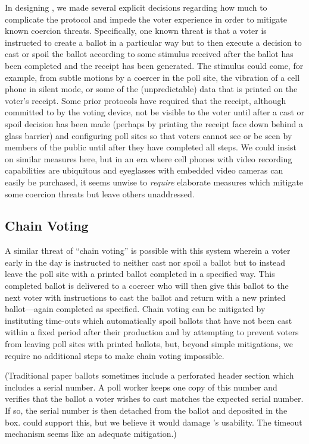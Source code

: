 \label{sec:coercion}

In designing \projname, we made several explicit decisions regarding how much to complicate the protocol and impede the voter experience in order to mitigate known coercion threats.  Specifically, one known threat is that a voter is instructed to create a ballot in a particular way but to then execute a decision to cast or spoil the ballot according to some stimulus received after the ballot has been completed and the receipt has been generated.  The stimulus could come, for example, from subtle motions by a coercer in the poll site, the vibration of a cell phone in silent mode, or some of the (unpredictable) data that is printed on the voter’s receipt.  Some prior protocols have required that the receipt, although committed to by the voting device, not be visible to the voter until after a cast or spoil decision has been made (perhaps by printing the receipt face down behind a glass barrier) and configuring poll sites so that voters cannot see or be seen by members of the public until after they have completed all steps.  We could insist on similar measures here, but in an era where cell phones with video recording capabilities are ubiquitous and eyeglasses with embedded video cameras can easily be purchased, it seems unwise to {\em require} elaborate measures which mitigate some coercion threats but leave others unaddressed.

\subsection{Chain Voting}
A similar threat of ``chain voting'' is possible with this system wherein a voter early in the day is instructed to neither cast nor spoil a ballot but to instead leave the poll site with a printed ballot completed in a specified way.  This completed ballot is delivered to a coercer who will then give this ballot to the next voter with instructions to cast the ballot and return with a new printed ballot---again completed as specified.  Chain voting can be mitigated by instituting time-outs which automatically spoil ballots that have not been cast within a fixed period after their production and by attempting to prevent voters from leaving poll sites with printed ballots, but, beyond simple mitigations, we require no additional steps to make chain voting impossible. 

(Traditional paper ballots sometimes include a perforated header section which includes a serial number. A poll worker keeps one copy of this number and verifies that the ballot a voter wishes to cast matches the expected serial number. If so, the serial number is then detached from the ballot and deposited in the box. \projname could support this, but we believe it would damage \projname's usability. The timeout mechanism seems like an adequate mitigation.)

